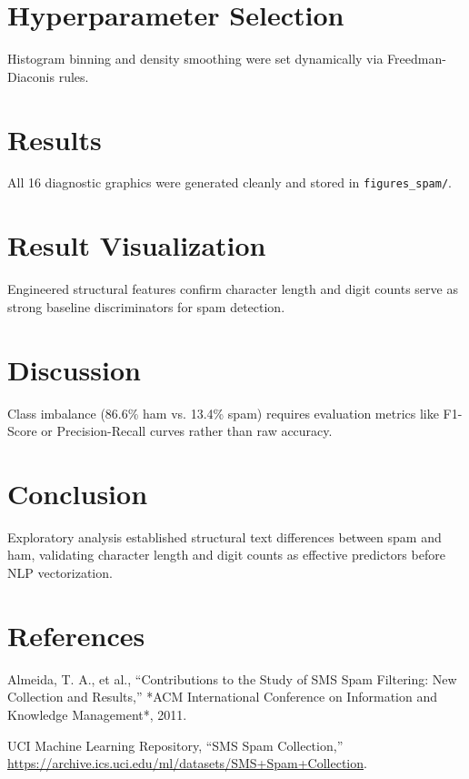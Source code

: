 \documentclass[12pt,a4paper]{article}
\begin{document}
\section{Hyperparameter Selection}
Histogram binning and density smoothing were set dynamically via Freedman-Diaconis rules.

\section{Results}
All 16 diagnostic graphics were generated cleanly and stored in \texttt{figures\_spam/}.

\section{Result Visualization}
Engineered structural features confirm character length and digit counts serve as strong baseline discriminators for spam detection.

\section{Discussion}
Class imbalance (86.6\% ham vs. 13.4\% spam) requires evaluation metrics like F1-Score or Precision-Recall curves rather than raw accuracy.

\section{Conclusion}
Exploratory analysis established structural text differences between spam and ham, validating character length and digit counts as effective predictors before NLP vectorization.

\section{References}
\begin{enumerate}[label={[\arabic*]}, leftmargin=2em]
    \item Almeida, T. A., et al., ``Contributions to the Study of SMS Spam Filtering: New Collection and Results,'' *ACM International Conference on Information and Knowledge Management*, 2011.
    \item UCI Machine Learning Repository, ``SMS Spam Collection,'' \url{https://archive.ics.uci.edu/ml/datasets/SMS+Spam+Collection}.
\end{enumerate}
\end{document}
